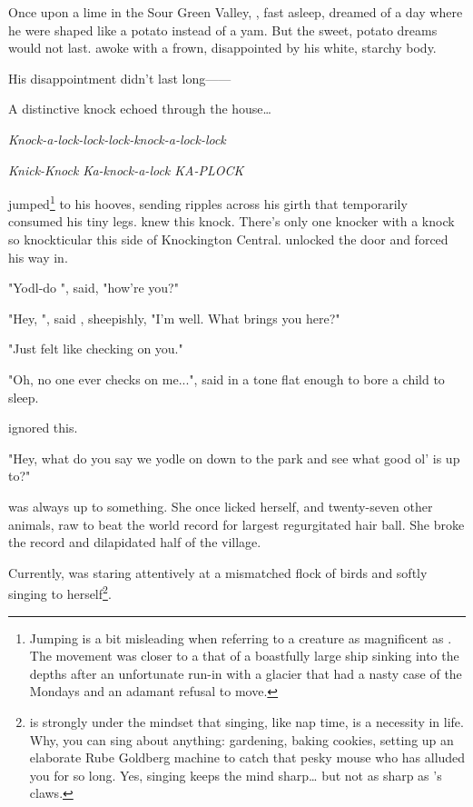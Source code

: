
\noindent
Once upon a lime in the Sour Green Valley, \uglyF{}, fast asleep, dreamed of a day
where he were shaped like a potato instead of a yam.  But the sweet, potato dreams
would not last.  \ugly{} awoke with a frown, disappointed by his white, starchy body.
\VV


\noindent
His disappointment didn't last long------

\noindent
A distinctive knock echoed through the house\ldots{}
\VV


\textit{Knock-a-lock-lock-lock-knock-a-lock-lock}


\textit{Knick-Knock Ka-knock-a-lock KA-\large{}PLOCK\normalsize}
\VV


\noindent
\ugly{} jumped\footnote{
Jumping is a bit misleading when referring to a creature as magnificent as \ugly{}.
The movement was closer to a that of a boastfully large ship sinking into the depths after an unfortunate
run-in with a glacier that had a nasty case of the Mondays and an adamant refusal to move.
}
to his hooves, sending ripples across his girth that temporarily consumed his tiny legs.
\ugly{} knew this knock.  There's only one knocker with a knock so knockticular this side of Knockington Central.
\uglyF{} unlocked the door and \yoloF{} forced his way in.
\VV


"Yodl-do \ugly{}", \yolo{} said, "how're you?"
\vv

"Hey, \yolo{}", said \ugly{}, sheepishly, "I'm well.  What brings you here?"
\vv

"Just felt like checking on you."
\vv

"Oh, no one ever checks on me...",
said \ugly{} in a tone flat enough to bore a child to sleep.
\VV


\noindent
\yolo{} ignored this.
\VV


"Hey, what do you say we yodle on down to the park and see what good ol' \pixel{} is up to?"
\VV


\noindent
\pixelF{} was always up to something.
She once licked herself, and twenty-seven other animals, raw to beat the world record for largest
regurgitated hair ball.  She broke the record and dilapidated half of the village.
\VV


\noindent
Currently, \pixel{} was staring attentively at a mismatched flock of birds and
softly singing to herself\footnote{
\pixel{} is strongly under the mindset that singing, like nap time, is a necessity
in life. Why, you can sing about anything: gardening, baking cookies, setting
up an elaborate Rube Goldberg machine to catch that pesky mouse who has alluded you
for so long.  Yes, singing keeps the mind sharp\ldots{} but not as sharp as \pixel's
claws.
}.
\VV


